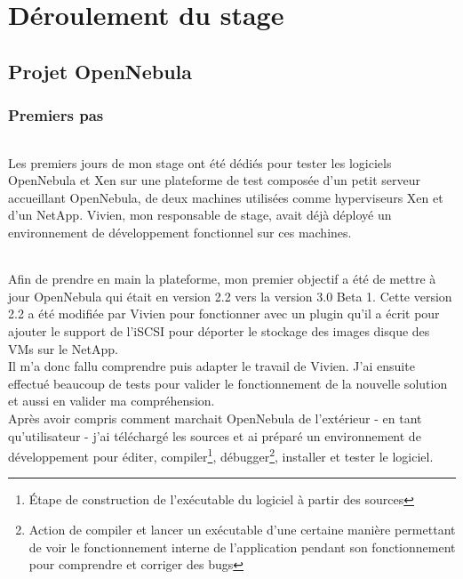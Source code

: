 \part{Déroulement du stage}

\chapter{Projet OpenNebula}

\section{Premiers pas}

\paragraph*{}
Les premiers jours de mon stage ont été dédiés pour tester les logiciels OpenNebula et Xen sur une plateforme de test
composée d'un petit serveur accueillant OpenNebula, de deux machines utilisées comme hyperviseurs Xen et d'un NetApp.
Vivien, mon responsable de stage, avait déjà déployé un environnement de développement fonctionnel sur ces machines.

\paragraph*{}
Afin de prendre en main la plateforme, mon premier objectif a été de mettre à jour OpenNebula qui était en version 2.2 vers la version 3.0 Beta 1.
Cette version 2.2 a été modifiée par Vivien pour fonctionner avec un plugin qu'il a écrit pour ajouter le support de l'iSCSI pour déporter le stockage des images
disque des VMs sur le NetApp.
\\
Il m'a donc fallu comprendre puis adapter le travail de Vivien. J'ai ensuite effectué beaucoup de tests pour valider le fonctionnement
de la nouvelle solution et aussi en valider ma compréhension.
\\
Après avoir compris comment marchait OpenNebula de l'extérieur - en tant qu'utilisateur - j'ai téléchargé les sources et ai préparé un
environnement de développement pour éditer, compiler\footnote{Étape de construction de l'exécutable du logiciel à partir des sources},
débugger\footnote{Action de compiler et lancer un exécutable d'une certaine manière permettant de voir le fonctionnement interne de l'application
pendant son fonctionnement pour comprendre et corriger des bugs}, installer et tester le logiciel.

